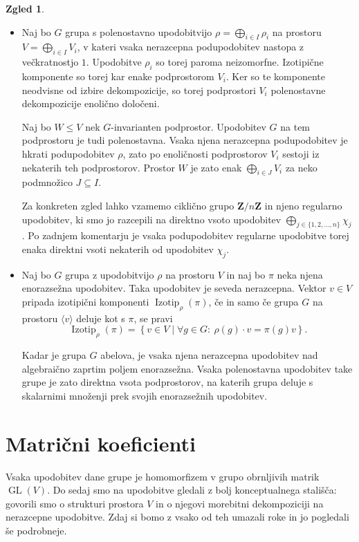 \documentclass[11pt]{book}
\def\ZZ{\mathbf{Z}}
\DeclareMathOperator\Izotip{Izotip}
\DeclareMathOperator\GL{GL}
\theoremstyle{definition}
\theoremstyle{zgled}
\newtheorem*{zgled}{Zgled}
\theoremstyle{odprtproblem}
\theoremstyle{domacanaloga}
\theoremstyle{izrek}
\begin{document}
\begin{zgled} \leavevmode
\begin{itemize}
\item Naj bo $G$ grupa s polenostavno upodobitvijo $\rho = \bigoplus_{i \in I} \rho_i$ na prostoru $V = \bigoplus_{i \in I} V_i$, v kateri vsaka nerazcepna podupodobitev nastopa z večkratnostjo $1$. Upodobitve $\rho_i$ so torej paroma neizomorfne. Izotipične komponente so torej kar enake podprostorom $V_i$. Ker so te komponente neodvisne od izbire dekompozicije, so torej podprostori $V_i$ polenostavne dekompozicije enolično določeni.

Naj bo $W \leq V$ nek $G$-invarianten podprostor. Upodobitev $G$ na tem podprostoru je tudi polenostavna. Vsaka njena nerazcepna podupodobitev je hkrati podupodobitev $\rho$, zato po enoličnosti podprostorov $V_i$ sestoji iz nekaterih teh podprostorov. Prostor $W$ je zato enak $\bigoplus_{i \in J} V_i$ za neko podmnožico $J \subseteq I$.

Za konkreten zgled lahko vzamemo ciklično grupo $\ZZ/n\ZZ$ in njeno regularno upodobitev, ki smo jo razcepili na direktno vsoto upodobitev $\bigoplus_{j \in \{ 1,2,\dots,n \}} \chi_j$. Po zadnjem komentarju je vsaka podupodobitev regularne upodobitve torej enaka direktni vsoti nekaterih od upodobitev $\chi_j$.

\item Naj bo $G$ grupa z upodobitvijo $\rho$ na prostoru $V$ in naj bo $\pi$ neka njena enorazsežna upodobitev. Taka upodobitev je seveda nerazcepna. Vektor $v \in V$ pripada izotipični komponenti $\Izotip_{\rho}(\pi)$, če in samo če grupa $G$ na prostoru $\langle v \rangle$ deluje kot s $\pi$, se pravi
\[
    \textstyle \Izotip_{\rho}(\pi) = \left\{ v \in V \mid \forall g \in G \colon \ \rho(g) \cdot v = \pi(g) v \right\}.
\]

Kadar je grupa $G$ abelova, je vsaka njena nerazcepna upodobitev nad algebraično zaprtim poljem enorazsežna. Vsaka polenostavna upodobitev take grupe je zato direktna vsota podprostorov, na katerih grupa deluje s skalarnimi množenji prek svojih enorazsežnih upodobitev.
\end{itemize}
\end{zgled}


\section{Matrični koeficienti}

Vsaka upodobitev dane grupe je homomorfizem v grupo obrnljivih matrik $\GL(V)$. Do sedaj smo na upodobitve gledali z bolj konceptualnega stališča: govorili smo o strukturi prostora $V$ in o njegovi morebitni dekompoziciji na nerazcepne upodobitve. Zdaj si bomo z vsako od teh umazali roke in jo pogledali še podrobneje. 
\end{document}
